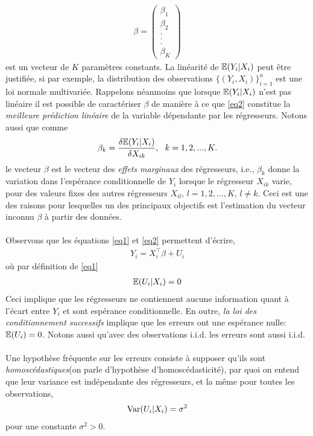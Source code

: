\begin{align*}
 \beta = \left(
 \begin{array}{c}
 \beta_1\\
 \beta_2\\
 .\\
 .\\
 .\\
 \beta_K
 \end{array}
 \right)
\end{align*}
est un vecteur de $K$ paramètres constants. La linéarité de $\mathbb{E}(Y_i|X_i)$ peut être justifiée, si par exemple, la distribution des observations $\{(Y_i, X_i)\}_{i=1}^n$ est une loi normale multivariée. Rappelons néanmoins que lorsque $\mathbb{E}(Y_i|X_i)$ n'est pas linéaire il est possible de caractériser $\beta$ de manière à ce que \eqref{eq2} constitue la \emph{meilleure prédiction linéaire} de la variable dépendante par les régresseurs. Notons aussi que comme
\begin{align*}
\beta_k = \frac{\delta \mathbb{E}(Y_i|X_i)}{\delta X_{ik}}, \ \ k=1,2,...,K.
\end{align*}
le vecteur $\beta$ est le vecteur des \emph{effets marginaux} des régresseurs, i.e., $\beta_k$ donne la variation dans l'espérance  conditionnelle de $Y_i$ lorsque le régresseur $X_{ik}$ varie, pour des valeurs fixes des autres régresseurs $X_{il}$, $l=1,2,...,K$, $l\neq k$. Ceci est une des raisons pour lesquelles un des principaux objectifs est l'estimation du vecteur inconnu $\beta$ à partir des données.\\\\
Observons que les équations \eqref{eq1} et \eqref{eq2} permettent d'écrire,
\begin{align}
Y_i = X_i^\top\beta +U_i
\label{eq3}
\end{align}
où par définition de \eqref{eq1}
\begin{align}
\mathbb{E}(U_i|X_i) = 0
\label{eq4}
\end{align}
Ceci implique que les régresseurs ne contiennent aucune information quant à l'écart entre $Y_i$ et sont espérance conditionnelle. En outre, \emph{la loi des conditionnement successifs} implique que les erreurs ont une espérance nulle: $\mathbb{E}(U_i) = 0$. Notons aussi qu'avec des observations i.i.d. les erreurs sont aussi i.i.d.\\\\
Une hypothèse fréquente sur les erreurs consiste à supposer qu'ils sont \emph{homoscédastiques}(on parle d'hypothèse d'homoscédasticité), par quoi on entend que leur variance est indépendante des régresseurs, et la même pour toutes les observations,
\begin{align*}
\mathrm{Var}(U_i|X_i) = \sigma^2
\end{align*}
pour une constante $\sigma^2>0$.

